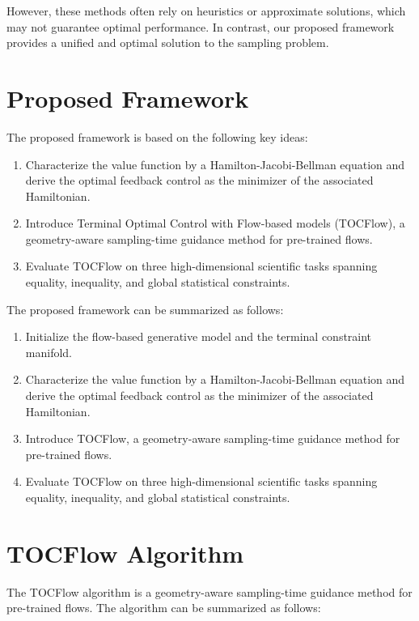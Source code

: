 \documentclass{article}
\begin{document}
        However, these methods often rely on heuristics or approximate solutions, which may not guarantee optimal performance. In contrast, our proposed framework provides a unified and optimal solution to the sampling problem.

        \section{Proposed Framework}

        The proposed framework is based on the following key ideas:

        \begin{enumerate}
        \item Characterize the value function by a Hamilton-Jacobi-Bellman equation and derive the optimal feedback control as the minimizer of the associated Hamiltonian.
        \item Introduce Terminal Optimal Control with Flow-based models (TOCFlow), a geometry-aware sampling-time guidance method for pre-trained flows.
        \item Evaluate TOCFlow on three high-dimensional scientific tasks spanning equality, inequality, and global statistical constraints.
        \end{enumerate}

        The proposed framework can be summarized as follows:

        \begin{enumerate}
        \item Initialize the flow-based generative model and the terminal constraint manifold.
        \item Characterize the value function by a Hamilton-Jacobi-Bellman equation and derive the optimal feedback control as the minimizer of the associated Hamiltonian.
        \item Introduce TOCFlow, a geometry-aware sampling-time guidance method for pre-trained flows.
        \item Evaluate TOCFlow on three high-dimensional scientific tasks spanning equality, inequality, and global statistical constraints.
        \end{enumerate}

        \section{TOCFlow Algorithm}

        The TOCFlow algorithm is a geometry-aware sampling-time guidance method for pre-trained flows. The algorithm can be summarized as follows:
\end{document}
